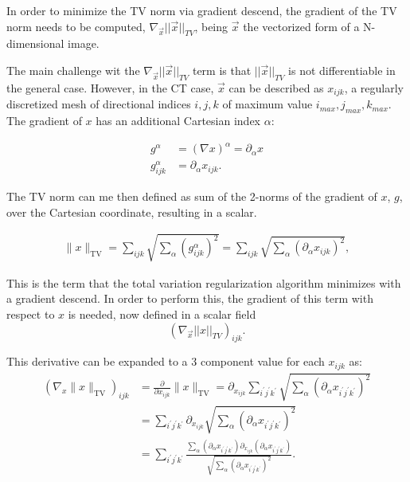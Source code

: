 In order to minimize the TV norm via gradient descend, the gradient of the TV norm needs to be computed, $ \nabla_{\vec{x}} ||\vec x ||_{TV}$, being $\vec x$ the vectorized form of a N-dimensional image.

The main challenge wit the $ \nabla_{\vec{x}} ||\vec x ||_{TV}$ term is that $ ||\vec x ||_{TV}$ is not differentiable in the general case. However, in the CT case, $\vec{x}$ can be described as $x_{ijk}$, a regularly discretized mesh of directional indices $i,j,k$ of maximum value $i_{max},j_{max},k_{max}$. The gradient of $x$ has an additional Cartesian index $\alpha$:

\begin{align}
g^\alpha &=\left(\nabla x\right)^\alpha=\partial_\alpha x\\
g^\alpha_{ijk} & = \partial_\alpha x_{ijk}.
\end{align}

The TV norm can me then defined as sum of the 2-norms of the gradient of $x$, $g$, over the Cartesian coordinate, resulting in a scalar.

\begin{align}
\lVert x \rVert_\text{TV}=\sum\limits_{ijk} \sqrt{\sum\limits_\alpha \left(g^\alpha_{ijk}\right)^2}=\sum\limits_{ijk} \sqrt{\sum\limits_\alpha \left(\partial_\alpha x_{ijk}\right)^2},
\end{align}

This is the term that the total variation regularization algorithm minimizes with a gradient descend. In order to perform this, the gradient of this term with respect to $x$ is needed, now defined in a scalar field
\begin{equation}
 (\nabla_{\vec{x}} || x ||_{TV})_{ijk}.
\end{equation} 

This derivative can be expanded to a 3 component value for each $x_{ijk}$ as:
\begin{align}
\left(\nabla_x \lVert x \rVert_\text{TV}\right)_{ijk}&= \frac{\partial}{\partial x_{ijk}} \lVert x \rVert_\text{TV} = \partial_{x_{ijk}} \sum\limits_{i^\prime j^\prime k^\prime} \sqrt{\sum\limits_\alpha \left(\partial_\alpha x_{i^\prime j^\prime k^\prime}\right)^2}\nonumber
\\
&= \sum\limits_{i^\prime j^\prime k^\prime} \partial_{x_{ijk}}\sqrt{\sum\limits_\alpha \left(\partial_\alpha x_{i^\prime j^\prime k^\prime}\right)^2} \nonumber \\ 
&=\sum\limits_{i^\prime j^\prime k^\prime} \frac{\sum_\alpha\left(\partial_\alpha x_{i^\prime j^\prime k^\prime}\right) \partial_{x_{ijk}} \left(\partial_\alpha x_{i^\prime j^\prime k^\prime}\right)}{\sqrt{\sum\limits_\alpha \left(\partial_\alpha x_{i^\prime j^\prime k^\prime}\right)^2}}.\label{eq:gradientTVdisc}
\end{align}

